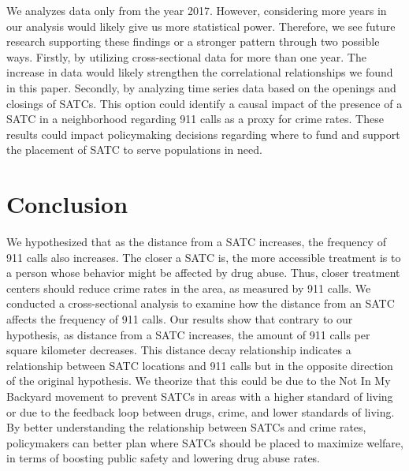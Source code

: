 \documentclass[12pt]{article}
\begin{document}
We analyzes data only from the year 2017. However, considering more years in our analysis would likely give us more statistical power. Therefore, we see future research supporting these findings or a stronger pattern through two possible ways. Firstly, by utilizing cross-sectional data for more than one year. The increase in data would likely strengthen the correlational relationships we found in this paper. Secondly, by analyzing time series data based on the openings and closings of SATCs. This option could identify a causal impact of the presence of a SATC in a neighborhood regarding 911 calls as a proxy for crime rates. These results could impact policymaking decisions regarding where to fund and support the placement of SATC to serve populations in need. 



\section{Conclusion}
\label{sec:conclusion}


We hypothesized that as the distance from a SATC increases, the frequency of 911 calls also increases. The closer a SATC is, the more accessible treatment is to a person whose behavior might be affected by drug abuse. Thus, closer treatment centers should reduce crime rates in the area, as measured by 911 calls. We conducted a cross-sectional analysis to examine how the distance from an SATC affects the frequency of 911 calls. Our results show that contrary to our hypothesis, as distance from a SATC increases, the amount of 911 calls per square kilometer decreases. This distance decay relationship indicates a relationship between SATC locations and 911 calls but in the opposite direction of the original hypothesis. We theorize that this could be due to the Not In My Backyard movement to prevent SATCs in areas with a higher standard of living or due to the feedback loop between drugs, crime, and lower standards of living. By better understanding the relationship between SATCs and crime rates, policymakers can better plan where SATCs should be placed to maximize welfare, in terms of boosting public safety and lowering drug abuse rates. 


 
\end{document}
